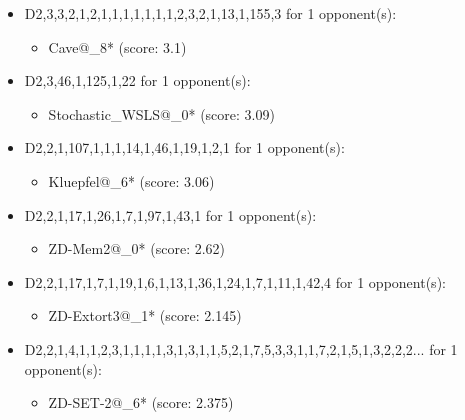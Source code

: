 \begin{appendices}
\begin{itemize}
    \item D2,3,3,2,1,2,1,1,1,1,1,1,1,2,3,2,1,13,1,155,3 for 1 opponent(s):
    \begin{multicols}{3}
         \begin{itemize}
            \item Cave@\_8* (score: 3.1)
        \end{itemize}
     \end{multicols}
     
    \item D2,3,46,1,125,1,22 for 1 opponent(s):
    \begin{multicols}{3}
         \begin{itemize}
            \item Stochastic\_WSLS@\_0* (score: 3.09)
        \end{itemize}
     \end{multicols}
     
    \item D2,2,1,107,1,1,1,14,1,46,1,19,1,2,1 for 1 opponent(s):
    \begin{multicols}{3}
         \begin{itemize}
            \item Kluepfel@\_6* (score: 3.06)
        \end{itemize}
     \end{multicols}
     
    \item D2,2,1,17,1,26,1,7,1,97,1,43,1 for 1 opponent(s):
    \begin{multicols}{3}
         \begin{itemize}
            \item ZD-Mem2@\_0* (score: 2.62)
        \end{itemize}
     \end{multicols}
     
    \item D2,2,1,17,1,7,1,19,1,6,1,13,1,36,1,24,1,7,1,11,1,42,4 for 1 opponent(s):
    \begin{multicols}{3}
         \begin{itemize}
            \item ZD-Extort3@\_1* (score: 2.145)
        \end{itemize}
     \end{multicols}
     
    \item D2,2,1,4,1,1,2,3,1,1,1,1,3,1,3,1,1,5,2,1,7,5,3,3,1,1,7,2,1,5,1,3,2,2,2... for 1 opponent(s):
    \begin{multicols}{3}
         \begin{itemize}
            \item ZD-SET-2@\_6* (score: 2.375)
        \end{itemize}
     \end{multicols}
     

\end{itemize}
\end{appendices}
